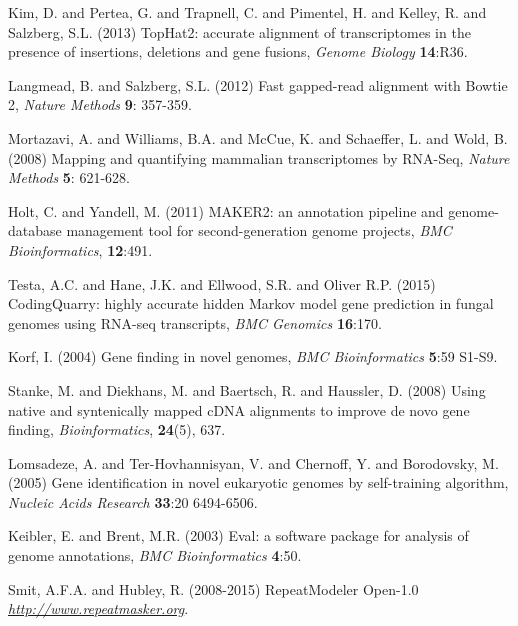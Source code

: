 \documentclass[a4paper,10pt]{report}
\begin{document}
\begin{thebibliography}{}
 Kim, D. and Pertea, G. and Trapnell, C. and Pimentel, H. and Kelley, R. and Salzberg, S.L. (2013) TopHat2: accurate alignment of transcriptomes in the presence of insertions, deletions and gene fusions, {\it Genome Biology} \textbf{14}:R36.

 Langmead, B. and Salzberg, S.L. (2012) Fast gapped-read alignment with Bowtie 2, \textit{Nature Methods} \textbf{9}: 357-359.

 Mortazavi, A. and Williams, B.A. and McCue, K. and Schaeffer, L. and Wold, B. (2008) Mapping and quantifying mammalian transcriptomes by RNA-Seq, \textit{Nature Methods} \textbf{5}: 621-628.

 Holt, C. and Yandell, M. (2011) MAKER2: an annotation pipeline and genome-database management tool for second-generation genome projects, \textit{BMC Bioinformatics}, \textbf{12}:491.

 Testa, A.C. and Hane, J.K. and Ellwood, S.R. and Oliver R.P. (2015) CodingQuarry: highly accurate hidden Markov model gene prediction in fungal genomes using RNA-seq transcripts, \textit{BMC Genomics} \textbf{16}:170.

 Korf, I. (2004) Gene finding in novel genomes, \textit{BMC Bioinformatics} \textbf{5}:59 S1-S9.

Stanke, M. and Diekhans, M. and Baertsch, R. and Haussler, D. (2008) Using native and syntenically mapped cDNA alignments to improve de novo gene finding, \textit{Bioinformatics}, \textbf{24}(5), 637.

 Lomsadeze, A. and Ter-Hovhannisyan, V. and Chernoff, Y. and Borodovsky, M. (2005) Gene identification in novel eukaryotic genomes by self-training algorithm, \textit{Nucleic Acids Research} \textbf{33}:20 6494-6506.

 Keibler, E. and Brent, M.R. (2003) Eval: a software package for analysis of genome annotations, \textit{BMC Bioinformatics} \textbf{4}:50.

 Smit, A.F.A. and Hubley, R. (2008-2015) RepeatModeler Open-1.0 \textit{\url{http://www.repeatmasker.org}}.

\end{thebibliography}
\end{document}
